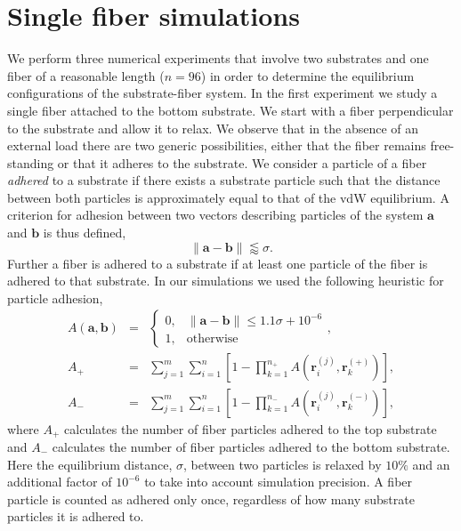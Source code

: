 \chapter{Single fiber simulations} \label{chap:three}

We perform three numerical experiments that involve two substrates and one fiber of a reasonable length ($n=96$) in order to determine the equilibrium configurations of the substrate-fiber system. In the first experiment we study a single fiber attached to the bottom substrate. We start with a fiber perpendicular to the substrate and allow it to relax. We observe that in the absence of an external load there are two generic possibilities, either that the fiber remains free-standing or that it adheres to the substrate. We consider a particle of a fiber \textit{adhered} to a substrate if there exists a substrate particle such that the distance between both particles is approximately equal to that of the vdW equilibrium. A criterion for adhesion between two vectors describing particles of the system $\textbf{a}$ and $\textbf{b}$ is thus defined,
\begin{equation} \label{eqn:criterion}
	\|\textbf{a} - \textbf{b}\| \lessapprox \sigma.
\end{equation}
Further a fiber is adhered to a substrate if at least one particle of the fiber is adhered to that substrate. In our simulations we used the following heuristic for particle adhesion, 
\begin{eqnarray} \label{eqn:adhesion}
	A(\textbf{a}, \textbf{b}) &=& \left\{ 
		\begin{array}{ll}
			0, & \|\textbf{a} - \textbf{b}\| \leq 1.1 \sigma + 10^{-6}\\
			1, & \mbox{otherwise}
		\end{array}
		\right. ,  \\
	A_+ &=& \sum_{j=1}^{m} \sum_{i=1}^{n} \left[ 1 - \prod_{k=1}^{n_+} A(\textbf{r}_i^{(j)},\textbf{r}_k^{(+)}) \right], \label{eqn:adhesion:top} \\ 
	A_- &=& \sum_{j=1}^{m} \sum_{i=1}^{n} \left[ 1 - \prod_{k=1}^{n_-} A(\textbf{r}_i^{(j)},\textbf{r}_k^{(-)}) \right], \label{eqn:adhesion:bottom}
\end{eqnarray}
where $A_+$ calculates the number of fiber particles adhered to the top substrate and $A_-$ calculates the number of fiber particles adhered to the bottom substrate.
Here the equilibrium distance, $\sigma$, between two particles is relaxed by $10\%$ and an additional factor of $10^{-6}$ to take into account simulation precision.
A fiber particle is counted as adhered only once, regardless of how many substrate particles it is adhered to.

